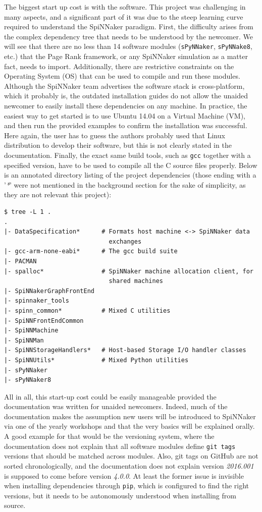 The biggest start up cost is with the software. This project was challenging in many aspects, and a significant part of it was due to the steep learning curve required to understand the SpiNNaker paradigm. First, the difficulty   arises from the complex dependency tree that needs to be understood by the newcomer. We will see that there are no less than 14 software modules (\texttt{sPyNNaker}, \texttt{sPyNNake8}, etc.) that the Page Rank framework, or any SpiNNaker simulation as a matter fact, needs to import. Additionally, there are restrictive constraints on the Operating System (OS) that can be used to compile and run these modules. Although the SpiNNaker team advertises the software stack is cross-platform, which it probably is, the outdated installation guides do not allow the unaided newcomer to easily install these dependencies on any machine. In practice, the easiest way to get started is to use Ubuntu 14.04 on a Virtual Machine (VM), and then run the provided examples to confirm the installation was successful. Here again, the user has to guess the authors probably used that Linux distribution to develop their software, but this is not clearly stated in the documentation. Finally, the exact same build tools, such as \texttt{gcc} together with a specified version, have to be used to compile all the C source files properly. Below is an annotated directory listing of the project dependencies (those ending with a '\textit{*}' were not mentioned in the background section for the sake of simplicity, as they are not relevant this project):

\begin{verbatim}
$ tree -L 1 .
.
|- DataSpecification*      # Formats host machine <-> SpiNNaker data 
                             exchanges
|- gcc-arm-none-eabi*      # The gcc build suite
|- PACMAN
|- spalloc*                # SpiNNaker machine allocation client, for 
                             shared machines
|- SpiNNakerGraphFrontEnd
|- spinnaker_tools
|- spinn_common*           # Mixed C utilities
|- SpiNNFrontEndCommon
|- SpiNNMachine
|- SpiNNMan
|- SpiNNStorageHandlers*   # Host-based Storage I/O handler classes
|- SpiNNUtils*             # Mixed Python utilities
|- sPyNNaker
|- sPyNNaker8
\end{verbatim}

All in all, this start-up cost could be easily manageable provided the documentation was written for unaided newcomers. Indeed, much of the documentation makes the assumption new users will be introduced to SpiNNaker via one of the yearly workshops and that the very basics will be explained orally. A good example for that would be the versioning system, where the documentation does not explain that all software modules define \texttt{git tags} versions that should be matched across modules. Also, git tags on GitHub are not sorted chronologically, and the documentation does not explain version \textit{2016.001} is supposed to come before version \textit{4.0.0}. At least the former issue is invisible when installing dependencies through \texttt{pip}, which is configured to find the right versions, but it needs to be autonomously understood when installing from source. \\

